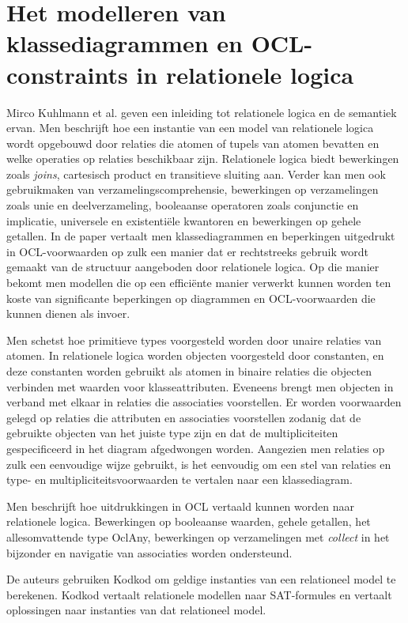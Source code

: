 \section{Het modelleren van klassediagrammen en OCL-constraints in relationele logica}
Mirco Kuhlmann et al.\cite{KuhlmannMirco2012FUaO} geven een inleiding tot relationele logica en de semantiek ervan. Men beschrijft hoe een instantie van een model van relationele logica wordt opgebouwd door relaties die atomen of tupels van atomen bevatten en welke operaties op relaties beschikbaar zijn. Relationele logica biedt bewerkingen zoals \textit{joins}, cartesisch product en transitieve sluiting aan. Verder kan men ook gebruikmaken van verzamelingscomprehensie, bewerkingen op verzamelingen zoals unie en deelverzameling, booleaanse operatoren zoals conjunctie en implicatie, universele en existenti\"ele kwantoren en bewerkingen op gehele getallen. In de paper vertaalt men klassediagrammen en beperkingen uitgedrukt in OCL-voorwaarden\cite{WarmerJosB1999Ocl:} op zulk een manier dat er rechtstreeks gebruik wordt gemaakt van de structuur aangeboden door relationele logica. Op die manier bekomt men modellen die op een effici\"ente manier verwerkt kunnen worden ten koste van significante beperkingen op diagrammen en OCL-voorwaarden die kunnen dienen als invoer.

Men schetst hoe primitieve types voorgesteld worden door unaire relaties van atomen. In relationele logica worden objecten voorgesteld door constanten, en deze constanten worden gebruikt als atomen in binaire relaties die objecten verbinden met waarden voor klasseattributen. Eveneens brengt men objecten in verband met elkaar in relaties die associaties voorstellen. Er worden voorwaarden gelegd op relaties die attributen en associaties voorstellen zodanig dat de gebruikte objecten van het juiste type zijn en dat de multipliciteiten gespecificeerd in het diagram afgedwongen worden. Aangezien men relaties op zulk een eenvoudige wijze gebruikt, is het eenvoudig om een stel van relaties en type- en multipliciteitsvoorwaarden te vertalen naar een klassediagram.

Men beschrijft hoe uitdrukkingen in OCL vertaald kunnen worden naar relationele logica. Bewerkingen op booleaanse waarden, gehele getallen, het allesomvattende type OclAny\cite{WarmerJosB1999Ocl:}, bewerkingen op verzamelingen met \textit{collect} in het bijzonder en navigatie van associaties worden ondersteund.

De auteurs gebruiken Kodkod\cite{10.1007/978-3-540-71209-1_49} om geldige instanties van een relationeel model te berekenen. Kodkod vertaalt relationele modellen naar SAT-formules en vertaalt oplossingen naar instanties van dat relationeel model.

